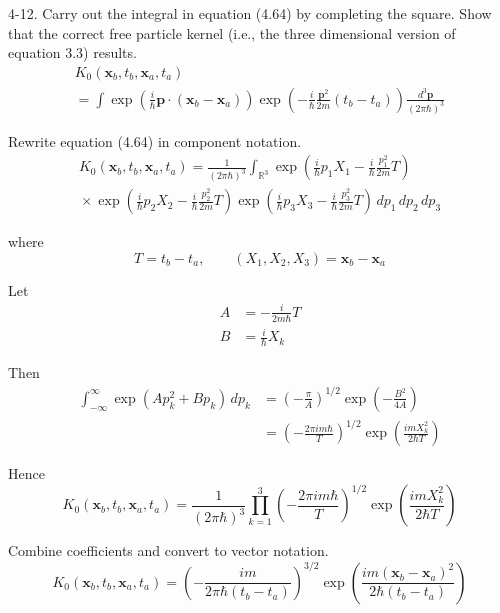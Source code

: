 \documentclass[12pt]{article}
\newcommand\INT{\int_{\mathbb R^3}}
\begin{document}
4-12.
Carry out the integral in equation (4.64) by completing the square.
Show that the correct free particle kernel
(i.e., the three dimensional version of equation 3.3) results.
\begin{multline*}
K_0(\mathbf x_b,t_b,\mathbf x_a,t_a)
\\
=\int
\exp\left(\frac{i}{\hbar}\mathbf p\cdot(\mathbf x_b-\mathbf x_a)\right)
\exp\left(-\frac{i}{\hbar}\frac{\mathbf p^2}{2m}(t_b-t_a)\right)
\frac{d^3\mathbf p}{(2\pi\hbar)^3}
\tag{4.64}
\end{multline*}

Rewrite equation (4.64) in component notation.
\begin{multline*}
K_0(\mathbf x_b,t_b,\mathbf x_a,t_a)=\frac{1}{(2\pi\hbar)^3}\INT
\exp\left(\frac{i}{\hbar}p_1X_1-\frac{i}{\hbar}\frac{p_1^2}{2m}T\right)
\\
{}\times
\exp\left(\frac{i}{\hbar}p_2X_2-\frac{i}{\hbar}\frac{p_2^2}{2m}T\right)
\exp\left(\frac{i}{\hbar}p_3X_3-\frac{i}{\hbar}\frac{p_3^2}{2m}T\right)
\,dp_1\,dp_2\,dp_3
\end{multline*}

where
\begin{equation*}
T=t_b-t_a,
\qquad
(X_1,X_2,X_3)=\mathbf x_b-\mathbf x_a
\end{equation*}

Let
\begin{align*}
A&=-\frac{i}{2m\hbar}T
\\
B&=\frac{i}{\hbar}X_k
\end{align*}

Then
\begin{align*}
\int_{-\infty}^\infty\exp(Ap_k^2+Bp_k)\,dp_k
&=\left(-\frac{\pi}{A}\right)^{1/2}\exp\left(-\frac{B^2}{4A}\right)
\\
&=\left(-\frac{2\pi im\hbar}{T}\right)^{1/2}
\exp\left(\frac{imX_k^2}{2\hbar T}\right)
\tag{1}
\end{align*}

Hence
\begin{equation*}
K_0(\mathbf x_b,t_b,\mathbf x_a,t_a)=
\frac{1}{(2\pi\hbar)^3}
\prod_{k=1}^3
\left(-\frac{2\pi im\hbar}{T}\right)^{1/2}
\exp\left(\frac{imX_k^2}{2\hbar T}\right)
\end{equation*}

Combine coefficients and convert to vector notation.
\begin{equation*}
K_0(\mathbf x_b,t_b,\mathbf x_a,t_a)=
\left(-\frac{im}{2\pi\hbar(t_b-t_a)}\right)^{3/2}
\exp\left(\frac{im(\mathbf x_b-\mathbf x_a)^2}{2\hbar(t_b-t_a)}\right)
\tag{2}
\end{equation*}
\end{document}
